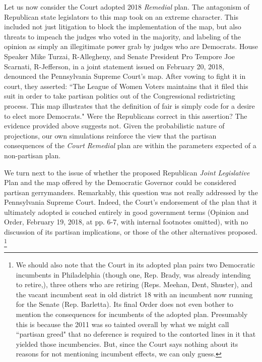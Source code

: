 \par
Let us now consider the Court adopted 2018 \textit{Remedial} plan. The antagonism of Republican state legislators to this map took on an extreme character. This included not just litigation to block the implementation of the map, but also threats to impeach the judges who voted in the majority, and labeling of the opinion as simply an illegitimate power grab by judges who are Democrats. House Speaker Mike Turzai, R-Allegheny, and Senate President Pro Tempore Joe Scarnati, R-Jefferson, in a joint statement issued on February 20, 2018, denounced the Pennsylvania Supreme Court’s map. After vowing to fight it in court, they asserted: ``The League of Women Voters maintains that it filed this suit in order to take partisan politics out of the Congressional redistricting process. This map illustrates that the definition of fair is simply code for a desire to elect more Democrats." Were the Republicans correct in this assertion? The evidence provided above suggests not. Given the probabilistic nature of projections, our own simulations reinforce the view that the partisan consequences of the \textit{Court Remedial} plan are within the parameters expected of a non-partisan plan. 
\par
We turn next to the issue of whether the proposed Republican \textit{Joint Legislative} Plan and the map offered by the Democratic Governor could be considered partisan gerrymanders. Remarkably, this question was not really addressed by the Pennsylvania Supreme Court. Indeed, the Court’s endorsement of the plan that it ultimately adopted is couched entirely in good government terms (Opinion and Order, February 19, 2018, at pp. 6-7, with internal footnotes omitted), with no discussion of its partisan implications, or those of the other alternatives proposed.
    \footnote{We should also note that the Court in its adopted plan pairs two Democratic incumbents in Philadelphia (though one, Rep. Brady, was already intending to retire,), three others who are retiring (Reps. Meehan, Dent, Shuster), and the vacant incumbent seat in old district 18 with an incumbent now running for the Senate (Rep. Barletta). Its final Order does not even bother to mention the consequences for incumbents of the adopted plan. Presumably this is because the 2011 was so tainted overall by what we might call ``partisan greed" that no deference is required to the contorted lines in it that yielded those incumbencies. But, since the Court says nothing about its reasons for not mentioning incumbent effects, we can only guess.}
